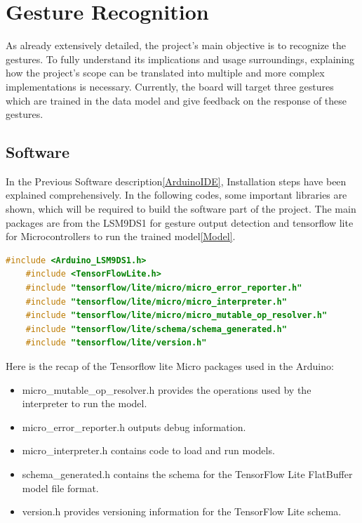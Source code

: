 \section{Gesture Recognition}
As already extensively detailed, the project's main objective is to recognize the gestures. To fully understand its implications and usage surroundings, explaining how the project’s scope can be translated into multiple and more complex implementations is necessary. Currently, the board will target three gestures which are trained in the data model and give feedback on the response of these gestures.

\subsection{Software}
In the Previous Software description\ref{ArduinoIDE}, Installation steps have been explained comprehensively. In the following codes, some important libraries are shown, which will be required to build the software part of the project. The main packages are from the LSM9DS1 for gesture output detection and tensorflow lite for Microcontrollers to run the trained model\ref{Model}. 
\begin{lstlisting}[language=C++, caption={C++ Code for Initializing TensorFlow Lite on Arduino}, label={code:arduino-tensorflow-init}, style=bashstyle]
	#include <Arduino_LSM9DS1.h>
	#include <TensorFlowLite.h>
	#include "tensorflow/lite/micro/micro_error_reporter.h"
	#include "tensorflow/lite/micro/micro_interpreter.h"
	#include "tensorflow/lite/micro/micro_mutable_op_resolver.h"
	#include "tensorflow/lite/schema/schema_generated.h"
	#include "tensorflow/lite/version.h"
\end{lstlisting}

Here is the recap of the Tensorflow lite Micro packages used in the Arduino: 
\begin{itemize}
	\item micro\_mutable\_op\_resolver.h provides the operations used by the interpreter to run the model.
	\item micro\_error\_reporter.h outputs debug information.
	\item micro\_interpreter.h contains code to load and run models.
	\item schema\_generated.h contains the schema for the TensorFlow Lite FlatBuffer model file format.
	\item version.h provides versioning information for the TensorFlow Lite schema.
\end{itemize}


